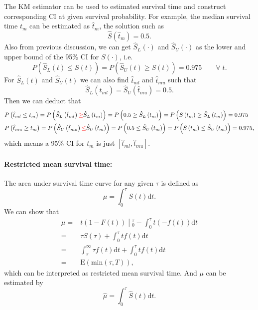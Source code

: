 \documentclass[a4paper,12pt]{article}
\begin{document}
The KM estimator can be used to estimated survival time and construct corresponding CI at given survival probability. For example, the median survival time $t_m$ can be estimated as $\hat{t}_m$, the solution such as
\[
  \hat{S}\left(\hat{t}_m\right) = 0.5
  .
\]
Also from previous discussion, we can get $\hat{S}_L\left(\cdot\right)$ and $\hat{S}_U\left(\cdot\right)$ as the lower and upper bound of the 95\% CI for $S\left(\cdot\right)$, i.e.
\[
  P\left(
    \hat{S}_L\left(t\right) \leq S\left(t\right)
  \right)
  = P\left(
    \hat{S}_U\left(t\right) \geq S\left(t\right)
  \right)
  = 0.975
  \quad\quad\forall\; t
  .
\]
For $\hat{S}_L\left(t\right)$ and $\hat{S}_U\left(t\right)$ we can also find $\hat{t}_{ml}$ and $\hat{t}_{mu}$ such that
\[
  \hat{S}_L\left(\hat{t}_{ml}\right) = \hat{S}_U\left(\hat{t}_{mu}\right) = 0.5.
\]
Then we can deduct that
\[
  \begin{aligned}
    & P\left(\hat{t}_{ml} \leq t_m\right)
    = P\left(
      \hat{S}_{L}\left(\hat{t}_{ml}\right)
      {\color{red} \geq} \hat{S}_L\left(t_m\right)
    \right)
    = P\left(0.5 \geq \hat{S}_L\left(t_m\right)\right)
    = P\left(S\left(t_m\right)
      \geq \hat{S}_L\left(t_m\right)\right)
    = 0.975    \\
    & P\left(\hat{t}_{mu} \geq t_m\right)
    = P\left(
      \hat{S}_U\left(\hat{t}_{mu}\right)
      {\color{red} \leq}
      \hat{S}_U\left(t_m\right)
    \right)
    = P\left(0.5 \leq \hat{S}_U\left(t_m\right)\right)
    = P\left(
      S\left(t_m\right)
      \leq \hat{S}_U\left(t_m\right)
    \right)
    = 0.975
    ,
  \end{aligned}
\]
which means a 95\% CI for $t_m$ is just $[\hat{t}_{ml}, \hat{t}_{mu}]$.

\paragraph{Restricted mean survival time: }

The area under survival time curve for any given $\tau$ is defined as
\[
  \mu = \int_0^\tau S\left(t\right)\mathrm{d}t.
\]
We can show that
\[
  \begin{aligned}
    \mu =&
    \left.
      t\left(1 - F\left(t\right)\right)\middle|_0^\tau
    \right.
    - \int_0^\tau t\left(-f\left(t\right)\right)\mathrm{d}t    \\
    =& \tau S\left(\tau\right) + \int_0^\tau tf\left(t\right)\mathrm{d}t    \\
    =& \int_\tau^\infty \tau f\left(t\right)\mathrm{d}t    
    + \int_0^\tau tf\left(t\right)\mathrm{d}t    \\
    =& \mathrm{E}\left(
      \mathrm{min}\left(\tau, T\right)
    \right)
    ,       
  \end{aligned}
\]
which can be interpreted as restricted mean survival time. And $\mu$ can be estimated by
\[
  \hat{\mu} = \int_0^\tau\hat{S}\left(t\right)\mathrm{d}t
  .
\]




\end{document}
